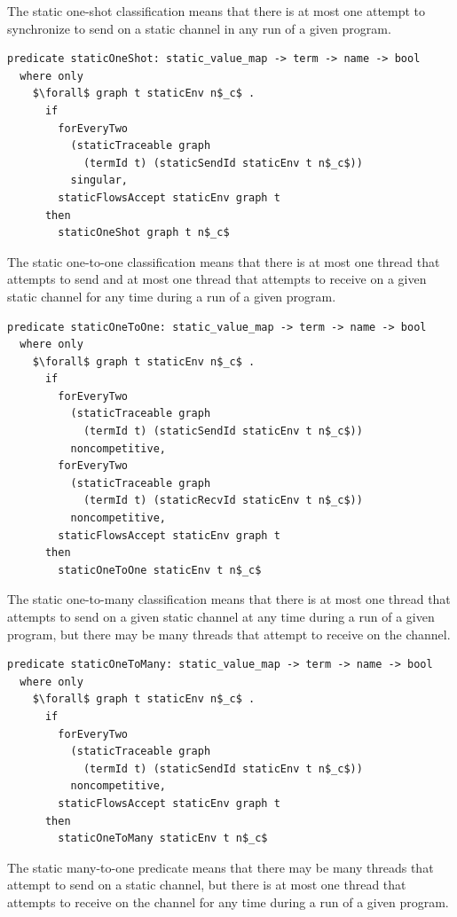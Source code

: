 \documentclass[letterpaper, 11pt]{extarticle}
\begin{document}
The static one-shot classification means that there is at most one attempt
to synchronize to send on a static channel in any run of a given program.

\begin{lstlisting}[language=logic, mathescape]
  predicate staticOneShot: static_value_map -> term -> name -> bool
  where only
    $\forall$ graph t staticEnv n$_c$ .
      if
        forEveryTwo
          (staticTraceable graph
            (termId t) (staticSendId staticEnv t n$_c$))
          singular,
        staticFlowsAccept staticEnv graph t
      then
        staticOneShot graph t n$_c$
\end{lstlisting}

The static one-to-one classification means that there is at most one thread that attempts to
send and at most one thread that attempts to receive on a given static channel for any time
during a run of a given program.

\begin{lstlisting}[language=logic, mathescape]
  predicate staticOneToOne: static_value_map -> term -> name -> bool
  where only
    $\forall$ graph t staticEnv n$_c$ .
      if
        forEveryTwo
          (staticTraceable graph
            (termId t) (staticSendId staticEnv t n$_c$))
          noncompetitive, 
        forEveryTwo
          (staticTraceable graph
            (termId t) (staticRecvId staticEnv t n$_c$))
          noncompetitive, 
        staticFlowsAccept staticEnv graph t 
      then
        staticOneToOne staticEnv t n$_c$
\end{lstlisting}

The static one-to-many classification means that there is at most one thread that attempts to
send on a given static channel at any time during a run of a given program, but there may be
many threads that attempt to receive on the channel.

\begin{lstlisting}[language=logic, mathescape]
  predicate staticOneToMany: static_value_map -> term -> name -> bool
  where only
    $\forall$ graph t staticEnv n$_c$ .
      if
        forEveryTwo
          (staticTraceable graph
            (termId t) (staticSendId staticEnv t n$_c$))
          noncompetitive,
        staticFlowsAccept staticEnv graph t 
      then
        staticOneToMany staticEnv t n$_c$
\end{lstlisting}

The static many-to-one predicate means
that there may be many threads that attempt to send on a static channel, but there is at most
one thread that attempts to receive on the channel for any time during a run of a given
program.
\end{document}
